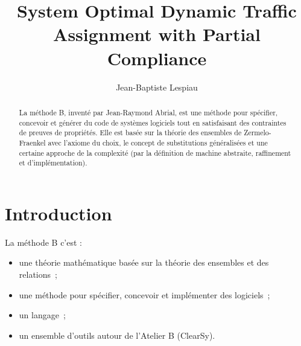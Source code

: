 \documentclass[10pt,a4paper]{article}
\author{Jean-Baptiste Lespiau}
\title{System Optimal Dynamic Traffic Assignment with Partial Compliance}
\begin{document}
\begin{abstract}
La méthode B, inventé par Jean-Raymond Abrial, est une méthode pour spécifier, concevoir et générer du code de systèmes logiciels tout en satisfaisant des contraintes de preuves de propriétés.
Elle est basée sur la théorie des ensembles de Zermelo-Fraenkel avec l'axiome du choix, le concept de substitutions généralisées et une certaine approche de la complexité (par la définition de machine abstraite, raffinement et d'implémentation).

\end{abstract}

\iffalse
0) Courte intro: on va parler de quoi ?
Schema : Meteor: page 374
L'Atelier B inventé en 92 par Abrial, développé par ??.
Utilisé dans tels projets (Météor etc)
Une phrase qui décrit l'idée générale:
\item une théorie mathématique basée sur les ensembles et les relations
\item une méthode pour spécifier, concevoir et implémenter des logiciels
\item un langage
\item un ensemble d'outils autour de l'Atelier B
1)J-B Théorie des ensembles + théorie des relations (en annexe dans le rapport ?)
Exemples
3)[Charles] Explication des machines abstraites et de tous leurs champs
Définie dans Dossier-Technique page 9
Exemple de la bibliothèque: Cours B Part I 2007
4bis) Preuves
5)[Charles] Raffinement d'une machine abstraite (Dossier Technique page 10)
Rajouter un exemple (commence page 193 de Spécification avec B)
5bis) Obligation de preuves des raffinements
6) Preuves et obligations de preuves
7)[J-B] Implémentation d'un raffinement (définir ce qu'il doit contenir ou non).

A la fin:
Les tableaux pour donner les équivalences entre symboles mathématiques et grammaire.
\fi

\section{Introduction}

La méthode B c'est :
\begin{itemize}
\item une théorie mathématique basée sur la théorie des ensembles et des relations~;
\item une méthode pour spécifier, concevoir et implémenter des logiciels~;
\item un langage~;
\item un ensemble d'outils autour de l'Atelier B (ClearSy).
\end{itemize}
~\newline
\end{document}
